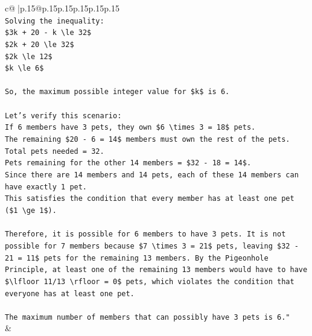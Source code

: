 \documentclass{article}
\begin{document}
{\begin{supertabular}{c@{$\;$}|p{.15\linewidth}@{}p{.15\linewidth}p{.15\linewidth}p{.15\linewidth}p{.15\linewidth}p{.15\linewidth}}
{{{\\ 
\texttt{Solving the inequality:} \\
\texttt{\$3k + 20 {-} k \textbackslash{}le 32\$} \\
\texttt{\$2k + 20 \textbackslash{}le 32\$} \\
\texttt{\$2k \textbackslash{}le 12\$} \\
\texttt{\$k \textbackslash{}le 6\$} \\
\\ 
\texttt{So, the maximum possible integer value for \$k\$ is 6.} \\
\\ 
\texttt{Let's verify this scenario:} \\
\texttt{If 6 members have 3 pets, they own \$6 \textbackslash{}times 3 = 18\$ pets.} \\
\texttt{The remaining \$20 {-} 6 = 14\$ members must own the rest of the pets.} \\
\texttt{Total pets needed = 32.} \\
\texttt{Pets remaining for the other 14 members = \$32 {-} 18 = 14\$.} \\
\texttt{Since there are 14 members and 14 pets, each of these 14 members can have exactly 1 pet.} \\
\texttt{This satisfies the condition that every member has at least one pet (\$1 \textbackslash{}ge 1\$).} \\
\\ 
\texttt{Therefore, it is possible for 6 members to have 3 pets. It is not possible for 7 members because \$7 \textbackslash{}times 3 = 21\$ pets, leaving \$32 {-} 21 = 11\$ pets for the remaining 13 members. By the Pigeonhole Principle, at least one of the remaining 13 members would have to have \$\textbackslash{}lfloor 11/13 \textbackslash{}rfloor = 0\$ pets, which violates the condition that everyone has at least one pet.} \\
\\ 
\texttt{The maximum number of members that can possibly have 3 pets is 6."} \\
            }
        }
    }
    & \\ \\


\end{supertabular}}
\end{document}

